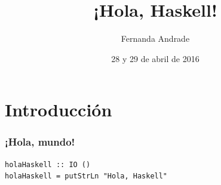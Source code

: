 \documentclass{beamer}
\title{¡Hola, Haskell!}
\author{Fernanda Andrade}
\institute{Stack Builders}
\date{28 y 29 de abril de 2016}
\begin{document}
  {%
    \frame{\titlepage}
  }



\section{Introducción}

\begin{frame}[fragile]
  \frametitle{¡Hola, mundo!}

\begin{lstlisting}
holaHaskell :: IO ()
holaHaskell = putStrLn "Hola, Haskell"
\end{lstlisting}


\end{frame}

\end{document}
